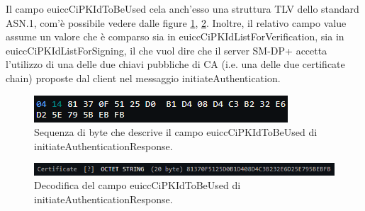 \documentclass[10pt, oneside]{book}
\begin{document}
Il campo euiccCiPKIdToBeUsed cela anch'esso una struttura TLV dello standard ASN.1, com'è possibile vedere dalle figure \ref{fig:asn1-euiccCiPKIdToBeUsed}, \ref{fig:decode-euiccCiPKIdToBeUsed}. Inoltre, il relativo campo value assume un valore che è comparso sia in euiccCiPKIdListForVerification, sia in euiccCiPKIdListForSigning, il che vuol dire che il server SM-DP+ accetta l'utilizzo di una delle due chiavi pubbliche di CA (i.e. una delle due certificate chain) proposte dal client nel messaggio initiateAuthentication.\\
\begin{figure}
\includegraphics[width=\linewidth]{asn1-euiccCiPKIdToBeUsed.png}
\caption{Sequenza di byte che descrive il campo euiccCiPKIdToBeUsed di initiateAuthenticationResponse.}
\label{fig:asn1-euiccCiPKIdToBeUsed}
\end{figure}
\begin{figure}
\includegraphics[width=\linewidth]{decode-euiccCiPKIdToBeUsed.png}
\caption{Decodifica del campo euiccCiPKIdToBeUsed di initiateAuthenticationResponse.}
\label{fig:decode-euiccCiPKIdToBeUsed}
\end{figure}
\end{document}
